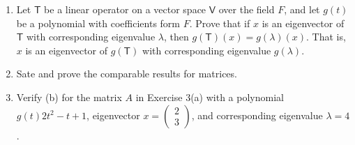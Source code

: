 \begin{enumerate}
\item Let $\mathsf{T}$ be a linear operator on a vector space
  $\mathsf{V}$ over the field $F$, and let $g(t)$ be a polynomial with
  coefficients form $F$. Prove that if $x$ is an eigenvector of
  $\mathsf{T}$ with corresponding eigenvalue $\lambda$, then
  $g(\mathsf{T})(x)= g(\lambda)(x)$. That is, $x$ is an eigenvector of
  $g(\mathsf{T})$ with corresponding eigenvalue $g(\lambda)$.
\item Sate and prove the comparable results for matrices.
\item Verify (b) for the matrix $A$ in Exercise 3(a) with a
  polynomial $g(t) 2t^2 -t +1$, eigenvector $x
  = \begin{pmatrix}2\\3\end{pmatrix}$, and corresponding eigenvalue
  $\lambda = 4$.
\end{enumerate}
